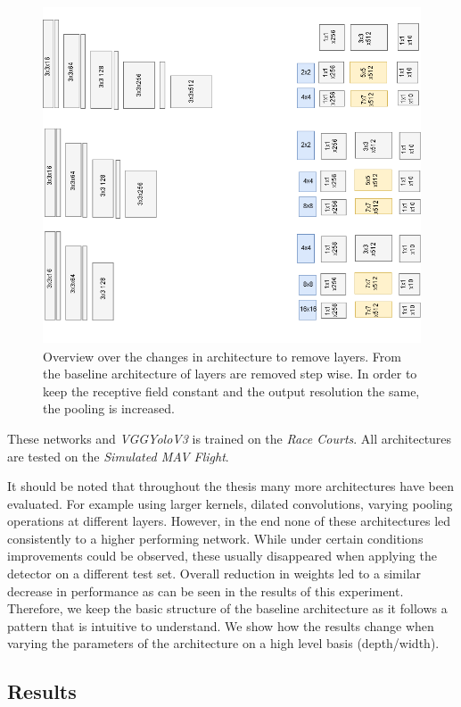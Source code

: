 \begin{figure}
	\centering
	\includegraphics[height=10cm]{fig/depth_changes}
	\caption{Overview over the changes in architecture to remove layers. From the baseline architecture of  layers are removed step wise. In order to keep the receptive field constant and the output resolution the same, the pooling is increased.}
	\label{fig:depth_changes}
\end{figure}

These networks and \textit{VGGYoloV3} is trained on the \textit{Race Courts}. All architectures are tested on the \textit{Simulated MAV Flight}.

It should be noted that throughout the thesis many more architectures have been evaluated. For example using larger kernels, dilated convolutions, varying pooling operations at different layers. However, in the end none of these architectures led consistently to a higher performing network. While under certain conditions improvements could be observed, these usually disappeared when applying the detector on a different test set. Overall reduction in weights led to a similar decrease in performance as can be seen in the results of this experiment. Therefore, we keep the basic structure of the baseline architecture as it follows a pattern that is intuitive to understand. We show how the results change when varying the parameters of the architecture on a high level basis (depth/width).

\subsection{Results}

